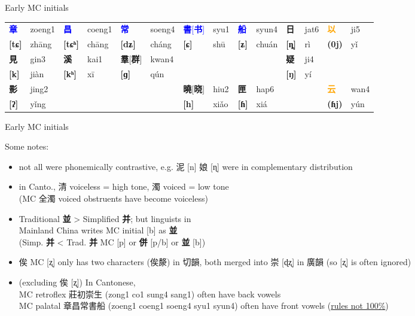 \documentclass{beamer}
\begin{document}
\begin{frame}[fragile]{Early MC initials}
\begin{adjustwidth}{-1.5em}{-1.5em}
\begin{table}
{\begin{tabular}{l l | l l | l l | l l | l l | l l | l l}
              \textcolor{blue}{\textbf{章}} & zoeng1 & \textcolor{blue}{\textbf{昌}} & coeng1 & \textcolor{blue}{\textbf{常}} & soeng4 & \textcolor{blue}{\textbf{書}[\textbf{书}]} & syu1 & \textcolor{blue}{\textbf{船}} & syun4 & \textbf{日} & jat6 & \textcolor{orange}{\textbf{以}} & ji5 \\
            \textbf{[tɕ]} & zhāng & \textbf{[tɕʰ]} & chāng & \textbf{[dʑ]} & cháng & \textbf{[ɕ]} & shū & \textbf{[ʑ]} & chuán & \textbf{[ȵ]} & rì & \textbf{(0j)} & yǐ \\ \hline
            \textbf{見} & gin3 & \textbf{溪} & kai1 & \textbf{羣}[\textbf{群}] & kwan4 & & & & & \textbf{疑} & ji4 & & \\
            \textbf{[k]}& jiàn & \textbf{[kʰ]} & xī & \textbf{[ɡ]}& qún & & & & & \textbf{[ŋ]}& yí & & \\ \hline
            \textbf{影} & jing2 & & & & & \textbf{曉}[\textbf{晓}] & hiu2 & \textbf{匣} & hap6 & & & \textcolor{orange}{\textbf{云}} & wan4 \\
            \textbf{[ʔ]}& yǐng & & & & & \textbf{[h]} & xiǎo & \textbf{[ɦ]} & xiá & & & \textbf{(ɦj)} & yún \\ \hline
        \end{tabular}}
    \end{table}
\end{adjustwidth}
\end{frame}

\begin{frame}[fragile]{Early MC initials}

Some notes:\\
\begin{itemize}
    \item not all were phonemically contrastive, e.g. 泥 [n] 娘 [ɳ] were in complementary distribution
    \item in Canto., 清 voiceless = high tone, 濁 voiced = low tone\\
    (MC 全濁 voiced obstruents have become voiceless)
    \item Traditional \textbf{並} > Simplified \textbf{并}; but linguists in \\
    Mainland China writes MC initial [b] as \textbf{並}\\
    (Simp. \textbf{并} < Trad. \textbf{并} MC [p] or \textbf{併} [p/b] or \textbf{並} [b])
    \item 俟 MC [ʐ] only has two characters (俟漦) in 切韻, both merged into 崇 [ɖʐ] in 廣韻 {\footnotesize (so [ʐ] is often ignored)}
    \item {\scriptsize (excluding 俟 [ʐ])} In Cantonese,\\ MC retroflex 莊初崇生 (zong1 co1 sung4 sang1) often have back vowels\\ MC palatal 章昌常書船 (zoeng1 coeng1 soeng4 syu1 syun4) often have front vowels (\underline{rules not 100\%})
\end{itemize}

\end{frame}
\end{document}
